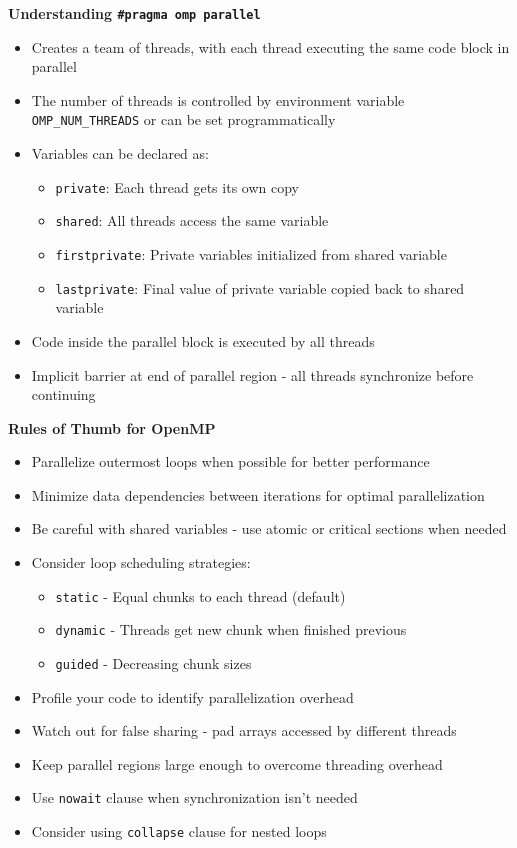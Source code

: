 \textbf{Understanding \texttt{\#pragma omp parallel}}
\begin{itemize}
    \item Creates a team of threads, with each thread executing the same code block in parallel
    \item The number of threads is controlled by environment variable \texttt{OMP\_NUM\_THREADS} or can be set programmatically
    \item Variables can be declared as:
    \begin{itemize}
        \item \texttt{private}: Each thread gets its own copy
        \item \texttt{shared}: All threads access the same variable
        \item \texttt{firstprivate}: Private variables initialized from shared variable
        \item \texttt{lastprivate}: Final value of private variable copied back to shared variable
    \end{itemize}
    \item Code inside the parallel block is executed by all threads
    \item Implicit barrier at end of parallel region - all threads synchronize before continuing
\end{itemize}

\textbf{Rules of Thumb for OpenMP}
\begin{itemize}
    \item Parallelize outermost loops when possible for better performance
    \item Minimize data dependencies between iterations for optimal parallelization
    \item Be careful with shared variables - use atomic or critical sections when needed
    \item Consider loop scheduling strategies:
    \begin{itemize}
        \item \texttt{static} - Equal chunks to each thread (default)
        \item \texttt{dynamic} - Threads get new chunk when finished previous
        \item \texttt{guided} - Decreasing chunk sizes
    \end{itemize}
    \item Profile your code to identify parallelization overhead
    \item Watch out for false sharing - pad arrays accessed by different threads
    \item Keep parallel regions large enough to overcome threading overhead
    \item Use \texttt{nowait} clause when synchronization isn't needed
    \item Consider using \texttt{collapse} clause for nested loops
\end{itemize}


